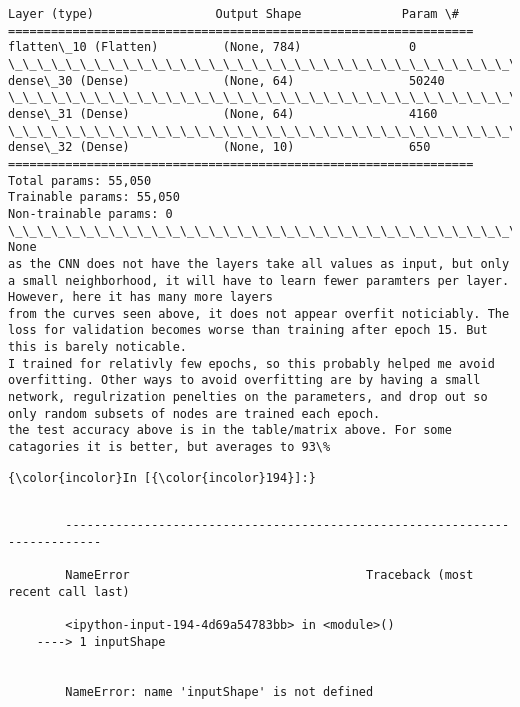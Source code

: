 \documentclass[11pt]{article}
\begin{document}
\begin{Verbatim}[commandchars=\\\{\}]
Layer (type)                 Output Shape              Param \#   
=================================================================
flatten\_10 (Flatten)         (None, 784)               0         
\_\_\_\_\_\_\_\_\_\_\_\_\_\_\_\_\_\_\_\_\_\_\_\_\_\_\_\_\_\_\_\_\_\_\_\_\_\_\_\_\_\_\_\_\_\_\_\_\_\_\_\_\_\_\_\_\_\_\_\_\_\_\_\_\_
dense\_30 (Dense)             (None, 64)                50240     
\_\_\_\_\_\_\_\_\_\_\_\_\_\_\_\_\_\_\_\_\_\_\_\_\_\_\_\_\_\_\_\_\_\_\_\_\_\_\_\_\_\_\_\_\_\_\_\_\_\_\_\_\_\_\_\_\_\_\_\_\_\_\_\_\_
dense\_31 (Dense)             (None, 64)                4160      
\_\_\_\_\_\_\_\_\_\_\_\_\_\_\_\_\_\_\_\_\_\_\_\_\_\_\_\_\_\_\_\_\_\_\_\_\_\_\_\_\_\_\_\_\_\_\_\_\_\_\_\_\_\_\_\_\_\_\_\_\_\_\_\_\_
dense\_32 (Dense)             (None, 10)                650       
=================================================================
Total params: 55,050
Trainable params: 55,050
Non-trainable params: 0
\_\_\_\_\_\_\_\_\_\_\_\_\_\_\_\_\_\_\_\_\_\_\_\_\_\_\_\_\_\_\_\_\_\_\_\_\_\_\_\_\_\_\_\_\_\_\_\_\_\_\_\_\_\_\_\_\_\_\_\_\_\_\_\_\_
None
as the CNN does not have the layers take all values as input, but only a small neighborhood, it will have to learn fewer paramters per layer. However, here it has many more layers
from the curves seen above, it does not appear overfit noticiably. The loss for validation becomes worse than training after epoch 15. But this is barely noticable.
I trained for relativly few epochs, so this probably helped me avoid overfitting. Other ways to avoid overfitting are by having a small network, regulrization penelties on the parameters, and drop out so only random subsets of nodes are trained each epoch.
the test accuracy above is in the table/matrix above. For some catagories it is better, but averages to 93\% 

    \end{Verbatim}

    \begin{Verbatim}[commandchars=\\\{\}]
{\color{incolor}In [{\color{incolor}194}]:} 
\end{Verbatim}


    \begin{Verbatim}[commandchars=\\\{\}]

        ---------------------------------------------------------------------------

        NameError                                 Traceback (most recent call last)

        <ipython-input-194-4d69a54783bb> in <module>()
    ----> 1 inputShape
    

        NameError: name 'inputShape' is not defined

    \end{Verbatim}


    
    
    
    
\end{document}
